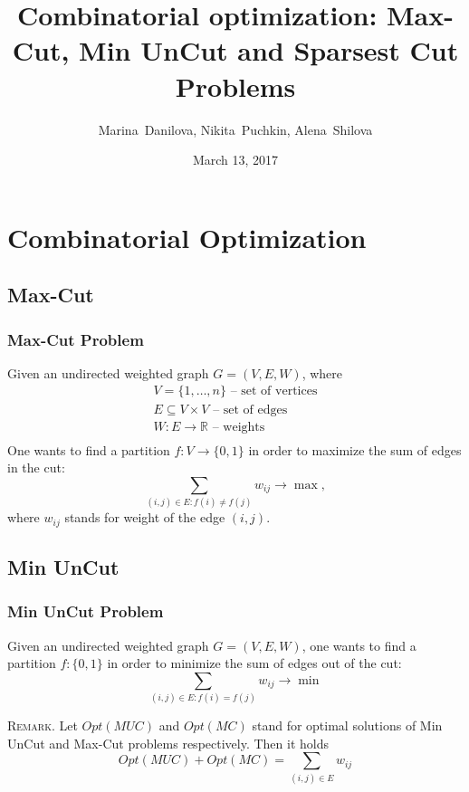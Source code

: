 \documentclass[10pt]{beamer}
\title
{Combinatorial optimization: Max-Cut, Min UnCut and Sparsest Cut Problems}
\author[M.~Danilova, N.~Puchkin, A.~Shilova]{\large Marina~Danilova, Nikita~Puchkin, 
Alena~Shilova}
\institute[Skoltech]{\textsc{Skolkovo Institute of Science and Technology}}
\date{\footnotesize{March 13, 2017}}
\begin{document}

\begin{frame}
    \titlepage
\end{frame}


\section{Combinatorial Optimization}

	\subsection{Max-Cut}
	
		\begin{frame}
			\frametitle{Max-Cut Problem}
			
			Given an undirected weighted graph $G = (V, E, W)$, where
			\begin{gather*}
				V  = \{ 1, \dots, n \} \text{ -- set of vertices} \\
				E \subseteq V \times V \text{ -- set of edges} \\
				W : E \rightarrow \mathbb R \text{ -- weights} \\
			\end{gather*}
			One wants to find a partition $f : V \rightarrow \{0, 1\}$ in order to maximize 
			the sum of edges in the cut:
			\[
				\sum\limits_{(i, j) \in E : f(i) \neq f(j)} w_{ij} \rightarrow \max,
			\]
			where $w_{ij}$ stands for weight of the edge $(i, j)$.
					
			
		\end{frame}
		
	\subsection{Min UnCut}
	
		\begin{frame}
			\frametitle{Min UnCut Problem}
			
			Given an undirected weighted graph $G = (V, E, W)$, one wants to find a 
			partition $f : \{ 
			0, 1 \}$ in order to minimize the sum of edges out of the cut:
			\[
				\sum\limits_{(i, j) \in E : f(i) = f(j)} w_{ij} \rightarrow \min
			\]
			
			\textsc{Remark.} Let $Opt( MUC )$ and $Opt( MC )$ stand for 
			optimal solutions of Min UnCut and Max-Cut problems respectively.
			Then it holds
			\[
				Opt( MUC ) + Opt( MC ) = \sum\limits_{(i, j) \in E} w_{ij}
			\]
		\end{frame}
		
\end{document}
